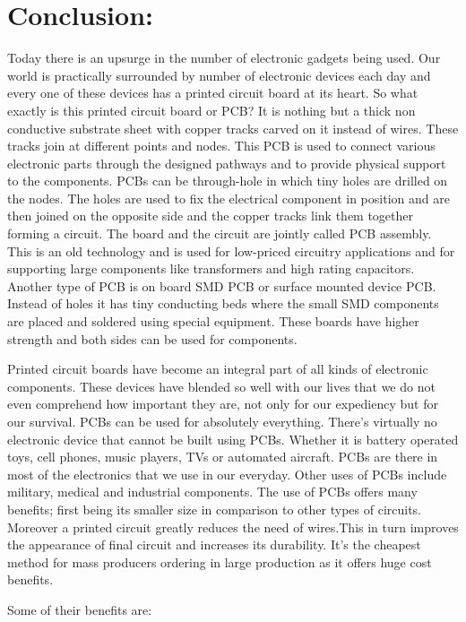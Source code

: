 \section{Conclusion:}

Today there is an upsurge in the number of electronic gadgets being used. Our world is practically surrounded by number of electronic devices each day and every one of these devices has a printed circuit board at its heart. So what exactly is this printed circuit board or PCB? It is nothing but a thick non conductive substrate sheet with copper tracks carved on it instead of wires. These tracks join at different points and nodes. This PCB is used to connect various electronic parts through the designed pathways and to provide physical support to the components. PCBs can be through-hole in which tiny holes are drilled on the nodes. The holes are used to fix the electrical component in position and are then joined on the opposite side and the copper tracks link them together forming a circuit. The board and the circuit are jointly called PCB assembly. This is an old technology and is used for low-priced circuitry applications and for supporting large components like transformers and high rating capacitors. Another type of PCB is on board SMD PCB or surface mounted device PCB. Instead of holes it has tiny conducting beds where the small SMD components are placed and soldered using special equipment. These boards have higher strength and both sides can be used for components. \hfill \break

Printed circuit boards have become an integral part of all kinds of electronic components. These devices have blended so well with our lives that we do not even comprehend how important they are, not only for our expediency but for our survival. PCBs can be used for absolutely everything. There's virtually no electronic device that cannot be built using PCBs. Whether it is battery operated toys, cell phones, music players, TVs or automated aircraft. PCBs are there in most of the electronics that we use in our everyday. Other uses of PCBs include military, medical and industrial components. The use of PCBs offers many benefits; first being its smaller size in comparison to other types of circuits. Moreover a printed circuit greatly reduces the need of wires.This in turn improves the appearance of final circuit and increases its durability. It's the cheapest method for mass producers ordering in large production as it offers huge cost benefits. \hfill \break

Some of their benefits are: \hfill \break 

